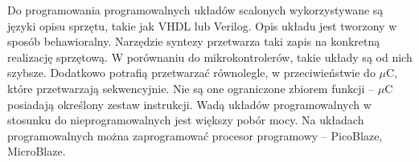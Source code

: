 Do programowania programowalnych układów scalonych wykorzystywane są języki opisu sprzętu, takie jak VHDL lub Verilog. Opis układu jest tworzony w sposób behawioralny. Narzędzie syntezy przetwarza taki zapis na konkretną realizację sprzętową. W porównaniu do mikrokontrolerów, takie układy są od nich szybsze. Dodatkowo potrafią przetwarzać równolegle, w przeciwieństwie do $\mu$C, które przetwarzają sekwencyjnie. Nie są one ograniczone zbiorem funkcji -- $\mu$C posiadają określony zestaw instrukcji. Wadą układów programowalnych w stosunku do nieprogramowalnych jest większy pobór mocy. Na układach programowalnych można zaprogramować procesor programowy -- PicoBlaze, MicroBlaze.
